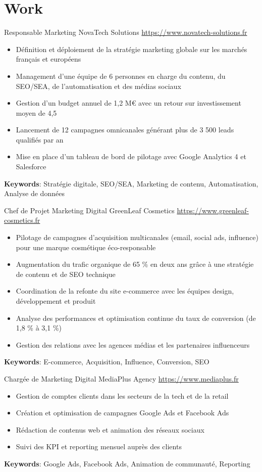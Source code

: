 \documentclass[a4paper, serif, 10pt]{moderncv}
\begin{document}
\section{Work}

        {Responsable Marketing}
        {NovaTech Solutions}
        {\url{https://www.novatech-solutions.fr}}
        {}
        {\begin{itemize}
\item Définition et déploiement de la stratégie marketing globale sur les marchés français et européens
\item Management d'une équipe de 6 personnes en charge du contenu, du SEO/SEA, de l'automatisation et des médias sociaux
\item Gestion d'un budget annuel de 1,2 M€ avec un retour sur investissement moyen de 4,5
\item Lancement de 12 campagnes omnicanales générant plus de 3 500 leads qualifiés par an
\item Mise en place d'un tableau de bord de pilotage avec Google Analytics 4 et Salesforce
\end{itemize}
\textbf{Keywords}: Stratégie digitale, SEO/SEA, Marketing de contenu, Automatisation, Analyse de données}

        {Chef de Projet Marketing Digital}
        {GreenLeaf Cosmetics}
        {\url{https://www.greenleaf-cosmetics.fr}}
        {}
        {\begin{itemize}
\item Pilotage de campagnes d'acquisition multicanales (email, social ads, influence) pour une marque cosmétique éco-responsable
\item Augmentation du trafic organique de 65 \% en deux ans grâce à une stratégie de contenu et de SEO technique
\item Coordination de la refonte du site e-commerce avec les équipes design, développement et produit
\item Analyse des performances et optimisation continue du taux de conversion (de 1,8 \% à 3,1 \%)
\item Gestion des relations avec les agences médias et les partenaires influenceurs
\end{itemize}
\textbf{Keywords}: E-commerce, Acquisition, Influence, Conversion, SEO}

        {Chargée de Marketing Digital}
        {MediaPlus Agency}
        {\url{https://www.mediaplus.fr}}
        {}
        {\begin{itemize}
\item Gestion de comptes clients dans les secteurs de la tech et de la retail
\item Création et optimisation de campagnes Google Ads et Facebook Ads
\item Rédaction de contenus web et animation des réseaux sociaux
\item Suivi des KPI et reporting mensuel auprès des clients
\end{itemize}
\textbf{Keywords}: Google Ads, Facebook Ads, Animation de communauté, Reporting}
\end{document}

